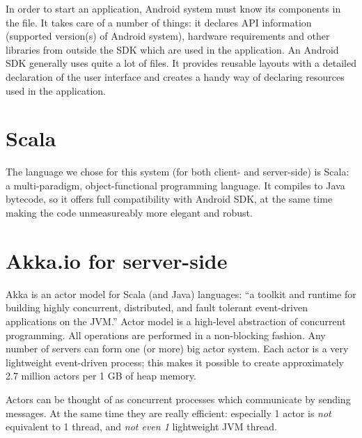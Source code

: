 In order to start an application, Android system must know its components in the  file. It takes care of a number of things: it declares API information (supported version(s) of Android system), hardware requirements and other libraries from outside the SDK which are used in the application. An Android SDK generally uses quite a lot of  files. It provides reusable layouts with a detailed declaration of the user interface and creates a handy way of declaring resources used in the application.

\section{Scala}
\label{sec:scala}

The language we chose for this system (for both client- and server-side) is Scala: a multi-paradigm, object-functional programming language. It compiles to Java bytecode, so it offers full compatibility with Android SDK, at the same time making the code unmeasureably more elegant and robust. \cite{Odersky:2008:Programming}


\section{Akka.io for server-side}
\label{sec:akka}


Akka is an actor model for Scala (and Java) languages: ``a toolkit and runtime for building highly concurrent, distributed, and fault tolerant event-driven applications on the JVM.'' Actor model is a high-level abstraction of concurrent programming. All operations are performed in a non-blocking fashion. Any number of servers can form one (or more) big actor system. Each actor is a very lightweight event-driven process; this makes it possible to create approximately 2.7 million actors per 1 GB of heap memory. \cite{Akka:2013:Docs}

Actors can be thought of as concurrent processes which communicate by sending messages. At the same time they are really efficient: especially 1 actor is \emph{not} equivalent to 1 thread, and \emph{not even 1} lightweight JVM thread.

